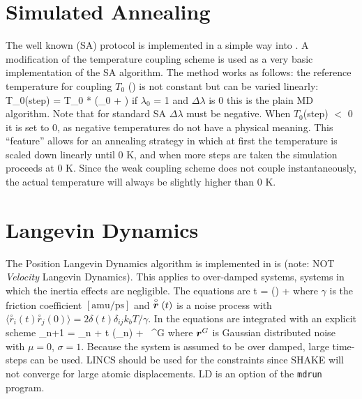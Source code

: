 \section{Simulated Annealing}
\label{sec:SA}
The well known 
(SA) protocol is implemented
in a simple way into {\gromacs}. A modification of the temperature coupling
scheme is used as a very basic implementation of the SA algorithm. The
method works as follows: the reference temperature for coupling $T_0$
()
is not constant but can be varied linearly:
\beq
T_0({\rm step}) = T_0 * (\lambda_0 + \Delta{})
\label{eqn:SA}
\eeq
if $\lambda_0$ = 1 and $\Delta\lambda$ is 0 this is the plain MD
algorithm. Note that for standard SA $\Delta\lambda$  must be negative.
When $T_0$(step) $<$ 0 it is set to 0, as negative temperatures do not have
a physical meaning. This ``feature'' 
allows for an annealing strategy in which
at first the temperature is scaled down linearly until 0 K, 
and when more steps
are taken the simulation proceeds at 0 K. Since the weak coupling scheme
does not couple instantaneously, the actual temperature will
always be slightly higher than 0 K.

\section{Langevin Dynamics}
\newcommand{\vrond}{\stackrel{\circ}{\ve{r}}}
\newcommand{\rond}{\stackrel{\circ}{r}}
\newcommand{\ruis}{\ve{r}^G}
\label{sec:LD}
The Position Langevin Dynamics algorithm is implemented in {\gromacs} is 
(note: NOT {\em Velocity} Langevin Dynamics). 
This applies to over-damped systems, 
{\ie} systems in which the inertia effects are negligible.
The equations are
\beq
{\de {} \over \de t} = {() \over \gamma} + \vrond
\eeq 
where $\gamma$ is the friction coefficient $[\mbox{amu/ps}]$ and
$\vrond(t)$  is a noise process with 
$\langle \rond_i\!(t) \rond_j\!(0) \rangle = 
    2 \delta(t) \delta_{ij} k_b T / \gamma$.
In {\gromacs} the equations are integrated with an explicit scheme
\beq
{}_{n+1} = _{n} +
        {\Delta t \over \gamma} (_n) 
        + \, \ruis 
\eeq
where $\ruis$ is  Gaussian distributed noise with $\mu = 0$, $\sigma = 1$.
Because the system is assumed to be over damped, large time-steps
can be used. LINCS should be used for the constraints since SHAKE
will not converge for large atomic displacements.
LD is an option of the \verb'mdrun' program.

